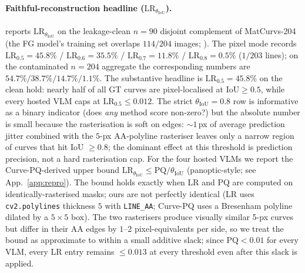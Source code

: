 \documentclass{article}
\begin{document}
\paragraph{Faithful-reconstruction headline ($\mathrm{LR}_{\theta_{\mathrm{IoU}}}$).}
 reports
$\mathrm{LR}_{\theta_{\mathrm{IoU}}}$ on the leakage-clean $n{=}90$
disjoint complement of MatCurvs-204 (the FG model's training set
overlaps $114/204$ images; ). The pixel mode
records
$\mathrm{LR}_{0.5}{=}45.8\%$ /
$\mathrm{LR}_{0.6}{=}35.5\%$ /
$\mathrm{LR}_{0.7}{=}11.8\%$ /
$\mathrm{LR}_{0.8}{=}0.5\%$ ($1/203$ lines); on the contaminated
$n{=}204$ aggregate the corresponding numbers are
$54.7\%/38.7\%/14.7\%/1.1\%$. The substantive headline is
$\mathrm{LR}_{0.5}{=}45.8\%$ on the clean hold: nearly half of all
GT curves are pixel-localised at $\mathrm{IoU}\ge 0.5$, while every
hosted VLM caps at $\mathrm{LR}_{0.5}\le 0.012$. The strict $\theta_{\mathrm{IoU}}{=}0.8$ row is informative as a
binary indicator (does \emph{any} method score non-zero?) but the
absolute number is small because the rasterisation is soft on edges:
$\sim 1$\,px of average prediction jitter combined with the
$5$-px AA-polyline rasteriser leaves only a narrow region of curves
that hit IoU $\ge 0.8$; the dominant effect at this threshold is
prediction precision, not a hard rasterisation cap.
For the four hosted VLMs we report the Curve-PQ-derived upper
bound $\mathrm{LR}_{\theta_{\mathrm{IoU}}}\le
\mathrm{PQ}/\theta_{\mathrm{IoU}}$ (panoptic-style; see App.~\ref{app:repro}). The bound holds
exactly when LR and PQ are computed on identically-rasterised
masks; ours are not perfectly identical (LR uses
\texttt{cv2.polylines} thickness $5$ with \texttt{LINE\_AA};
Curve-PQ uses a Bresenham polyline dilated by a $5{\times}5$ box).
The two rasterisers produce visually similar 5-px curves but differ
in their AA edges by $1$--$2$ pixel-equivalents per side, so we
treat the bound as approximate to within a small additive slack;
since $\mathrm{PQ}<0.01$ for every VLM, every LR entry remains
$\le 0.013$ at every threshold even after this slack is applied.
\end{document}
